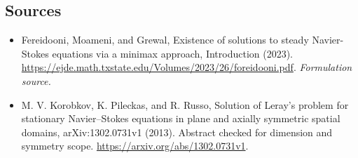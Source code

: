 \documentclass[11pt]{article}
\begin{document}
\subsection{Sources}
\begin{itemize}
\item[S1]Fereidooni, Moameni, and Grewal, Existence of solutions to steady Navier-Stokes equations via a minimax approach, Introduction (2023).
\url{https://ejde.math.txstate.edu/Volumes/2023/26/foreidooni.pdf}.
\textit{Formulation source.}
\item[S2] M. V. Korobkov, K. Pileckas, and R. Russo, Solution of Leray's problem for stationary Navier--Stokes equations in plane and axially symmetric spatial domains, arXiv:1302.0731v1 (2013). Abstract checked for dimension and symmetry scope.
\url{https://arxiv.org/abs/1302.0731v1}.
\end{itemize}
\end{document}
